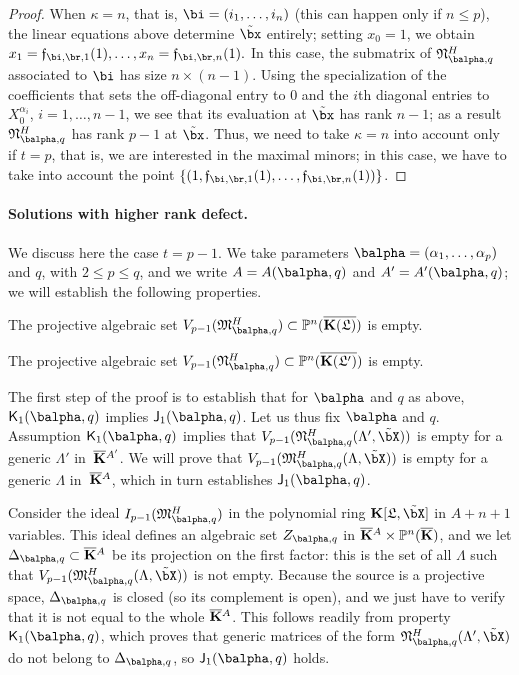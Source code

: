 \documentclass[12pt]{article}
\begin{document}
\begin{proof}
  When $\kappa=n$, that is, $\bi=(i_1,\dots,i_n)$ (this can happen
  only if $n \le p$), the linear equations above determine $\tilde\bx$
  entirely; setting $x_0=1$, we obtain
  $x_{1}=\mathfrak{f}_{\bi,\br,1}(1),\dots,x_{n}=\mathfrak{f}_{\bi,\br,n}(1).$
  In this case, the submatrix of $\mathfrak{N}^H_{\balpha,q}$
  associated to $\bi$ has size $n \times (n-1)$. Using the
  specialization of the coefficients that sets the off-diagonal entry
  to $0$ and the $i$th diagonal entries to $X_0^{\alpha_i}$,
  $i=1,\dots,n-1$, we see that its evaluation at $\tilde\bx$ has rank
  $n-1$; as a result $\mathfrak{N}^H_{\balpha,q}$ has rank $p-1$ at
  $\tilde \bx$. Thus, we need to take $\kappa=n$ into account only if
  $t=p$, that is, we are interested in the maximal minors; in this
  case, we have to take into account the point $\left \{
  (1,\mathfrak{f}_{\bi,\br,1}(1),\dots,\mathfrak{f}_{\bi,\br,n}(1))\right
  \}$.
\end{proof}


\paragraph{Solutions with higher rank defect.} 
We discuss here the case $t=p-1$.  We take parameters
$\balpha=(\alpha_1,\dots,\alpha_p)$ and $q$, with $2 \le p \le q$, and
we write $A=A(\balpha,q)$ and $A'=A'(\balpha,q)$; we will establish
the following properties.
\begin{description}[leftmargin=*]
\item[$\assI_1(\balpha,q).$] The projective algebraic set
  $V_{p-1}(\mathfrak{M}^H_{\balpha,q})\subset\P^n(\KKGbar)$ is empty.
\item[$\assJ_1(\balpha,q).$] The projective algebraic set
  $V_{p-1}(\mathfrak{N}^H_{\balpha,q})\subset\P^n(\KKGpbar)$ is empty.
\end{description}
The first step of the proof is to establish that for $\balpha$ and $q$
as above, $\assJ_1(\balpha,q)$ implies $\assI_1(\balpha,q)$. Let us
thus fix $\balpha$ and $q$.  Assumption $\assJ_1(\balpha,q)$ implies
that $V_{p-1}(\mathfrak{N}^H_{\balpha,q}(\Lambda',\tilde\bX))$ is
empty for a generic $\Lambda'$ in~$\overline{\mathbf{K}}{}^{A'}$.  We will prove that
$V_{p-1}(\mathfrak{M}^H_{\balpha,q}(\Lambda,\tilde\bX))$ is empty for a generic $\Lambda$
in~$\overline{\mathbf{K}}{}^A$, which in turn establishes $\assI_1(\balpha,q)$.

Consider the ideal $I_{p-1}(\mathfrak{M}^H_{\balpha,q})$ in the polynomial
ring $\KK[\mathfrak{L},\tilde\bX]$ in $A+n+1$ variables. This ideal
defines an algebraic set $Z_{\balpha,q}$ in $\overline{\mathbf{K}}{}^A \times
\mathbb{P}^n(\overline{\mathbf{K}})$, and we let $\Delta_{\balpha,q} \subset \KKbar{}^A$ be its
projection on the first factor: this is the set of all $\Lambda$ such that
$V_{p-1}(\mathfrak{M}^H_{\balpha,q}(\Lambda,\tilde\bX))$ is not empty. Because the source is
a projective space, $\Delta_{\balpha,q}$ is closed (so its complement is
open), and we just have to verify that it is not equal to the whole
$\overline{\mathbf{K}}{}^A$. This follows readily from property $\assJ_1(\balpha,q)$,
which proves that generic matrices of the form
$\mathfrak{N}^H_{\balpha,q}(\Lambda',\tilde\bX)$ do not belong to $\Delta_{\balpha,q}$, so 
$\assI_1(\balpha,q)$ holds.
\end{document}
